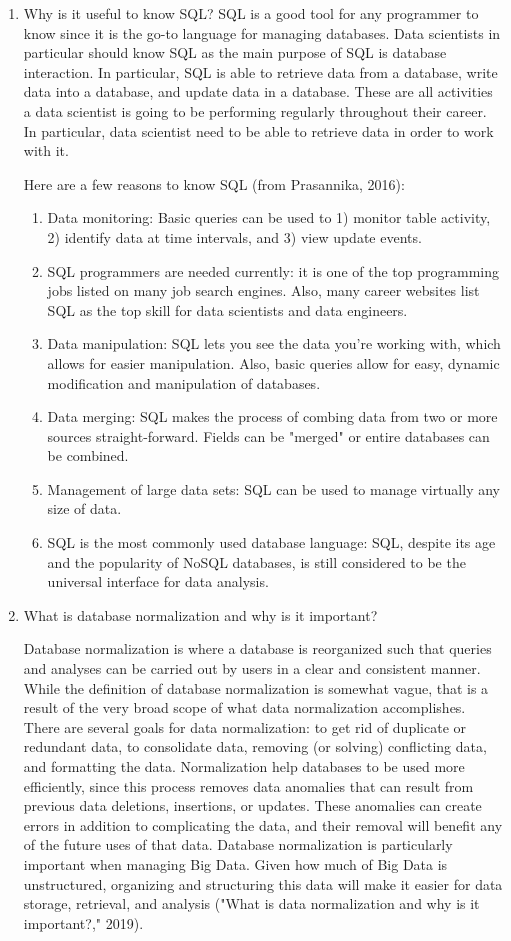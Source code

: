 \documentclass[]{article}
\begin{document}
\begin{enumerate}
\item Why is it useful to know SQL?
SQL is a good tool for any programmer to know since it is the go-to language for managing databases.  Data scientists in particular should know SQL as the main purpose of SQL is database interaction.  In particular, SQL is able to retrieve data from a database, write data into a database, and update data in a database.  These are all activities a data scientist is going to be performing regularly throughout their career.  In particular, data scientist need to be able to retrieve data in order to work with it.  

Here are a few reasons to know SQL (from Prasannika, 2016):
\begin{enumerate}
	\item Data monitoring: Basic queries can be used to 1) monitor table activity, 2) identify data at time intervals, and 3) view update events.
	\item SQL programmers are needed currently: it is one of the top programming jobs listed on many job search engines.  Also, many career websites list SQL as the top skill for data scientists and data engineers.
	\item Data manipulation: SQL lets you see the data you're working with, which allows for easier manipulation.  Also, basic queries allow for easy, dynamic modification and manipulation of databases.
	\item Data merging: SQL makes the process of combing data from two or more sources straight-forward.  Fields can be "merged" or entire databases can be combined.
	\item Management of large data sets: SQL can be used to manage virtually any size of data.  
	\item SQL is the most commonly used database language: SQL, despite its age and the popularity of NoSQL databases, is still considered to be the universal interface for data analysis.
\end{enumerate}

\item What is database normalization and why is it important?

Database normalization is where a database is reorganized such that queries and analyses can be carried out by users in a clear and consistent manner.  While the definition of database normalization is somewhat vague, that is a result of the very broad scope of what data normalization accomplishes.  There are several goals for data normalization: to get rid of duplicate or redundant data, to consolidate data, removing (or solving) conflicting data, and formatting the data.  Normalization help databases to be used more efficiently, since this process removes data anomalies that can result from previous data deletions, insertions, or updates.  These anomalies can create errors in addition to complicating the data, and their removal will benefit any of the future uses of that data.  Database normalization is particularly important when managing Big Data.  Given how much of Big Data is unstructured, organizing and structuring this data will make it easier for data storage, retrieval, and analysis ("What is data normalization and why is it important?," 2019).  


\end{enumerate}
\end{document}
